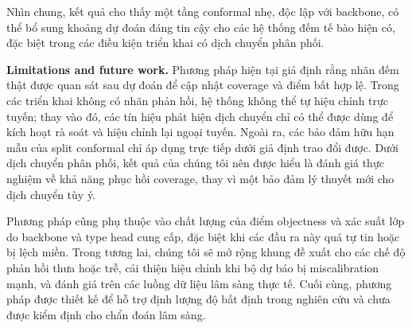 \documentclass[pdflatex,sn-mathphys-num]{sn-jnl}
\begin{document}
Nhìn chung, kết quả cho thấy một tầng conformal nhẹ, độc lập với backbone, có thể bổ
sung khoảng dự đoán đáng tin cậy cho các hệ thống đếm tế bào hiện có, đặc biệt trong
các điều kiện triển khai có dịch chuyển phân phối.

\textbf{Limitations and future work.}
Phương pháp hiện tại giả định rằng nhãn đếm thật được quan sát sau dự đoán để cập nhật
coverage và điểm bất hợp lệ. Trong các triển khai không có nhãn phản hồi, hệ thống
không thể tự hiệu chỉnh trực tuyến; thay vào đó, các tín hiệu phát hiện dịch chuyển
chỉ có thể được dùng để kích hoạt rà soát và hiệu chỉnh lại ngoại tuyến. Ngoài ra, các
bảo đảm hữu hạn mẫu của split conformal chỉ áp dụng trực tiếp dưới giả định trao đổi
được. Dưới dịch chuyển phân phối, kết quả của chúng tôi nên được hiểu là đánh giá thực
nghiệm về khả năng phục hồi coverage, thay vì một bảo đảm lý thuyết mới cho dịch
chuyển tùy ý.

Phương pháp cũng phụ thuộc vào chất lượng của điểm objectness và xác suất lớp do
backbone và type head cung cấp, đặc biệt khi các đầu ra này quá tự tin hoặc bị lệch
miền. Trong tương lai, chúng tôi sẽ mở rộng khung đề xuất cho các chế độ phản hồi thưa
hoặc trễ, cải thiện hiệu chỉnh khi bộ dự báo bị miscalibration mạnh, và đánh giá trên
các luồng dữ liệu lâm sàng thực tế. Cuối cùng, phương pháp được thiết kế để hỗ trợ định
lượng độ bất định trong nghiên cứu và chưa được kiểm định cho chẩn đoán lâm sàng.
\end{document}
